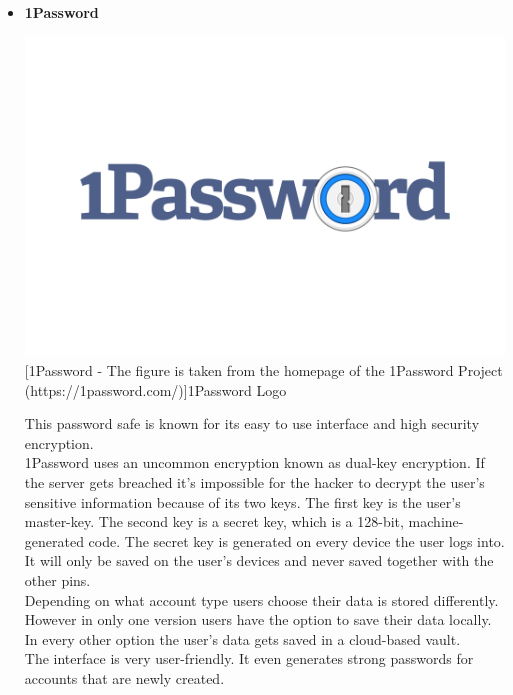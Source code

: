 \documentclass[conference]{IEEEtran}
\begin{document}
\begin{itemize}
\item \textbf{1Password}\\
\begin{center}
\includegraphics[scale=0.06]{./images/1Password-Logo.wine.png}
[1Password - The figure is taken from the homepage of the 1Password Project (https://1password.com/)]{1Password Logo}
\end{center}
This password safe is known for its easy to use interface and high security encryption.\\ 
1Password uses an uncommon encryption known as dual-key encryption. If the server gets breached it's impossible for the hacker to decrypt the user's sensitive information because of its two keys. The first key is the user's master-key. The second key is a secret key, which is a 128-bit, machine-generated code. The secret key is generated on every device the user logs into. It will only be saved on the user's devices and never saved together with the other pins.\\
Depending on what account type users choose their data is stored differently. However in only one version users have the option to save their data locally. In every other option the user's data gets saved in a cloud-based vault.\\
The interface is very user-friendly. It even generates strong passwords for accounts that are newly created.
\cite{b7}
 
\end{itemize}
\end{document}
